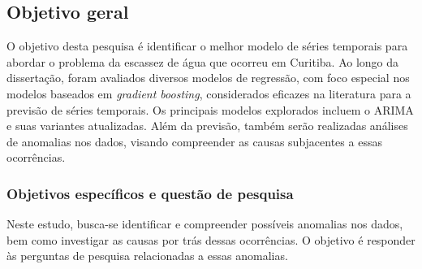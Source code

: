 \subsection{Objetivo geral} \label{subsec:objetivos}


 
O objetivo desta pesquisa é identificar o melhor modelo de séries temporais para abordar o problema da escassez de água que ocorreu em Curitiba. Ao longo da dissertação, foram avaliados diversos modelos de regressão, com foco especial nos modelos baseados em \textit{gradient boosting}, considerados eficazes na literatura para a previsão de séries temporais. Os principais modelos explorados incluem o ARIMA e suas variantes atualizadas. Além da previsão, também serão realizadas análises de anomalias nos dados, visando compreender as causas subjacentes a essas ocorrências.
    
    
    \subsubsection{Objetivos espec\'ificos e quest\~ao de pesquisa} \label{subsubsec:obespec}
    
Neste estudo, busca-se identificar e compreender possíveis anomalias nos dados, bem como investigar as causas por trás dessas ocorrências. O objetivo é responder às perguntas de pesquisa relacionadas a essas anomalias.

